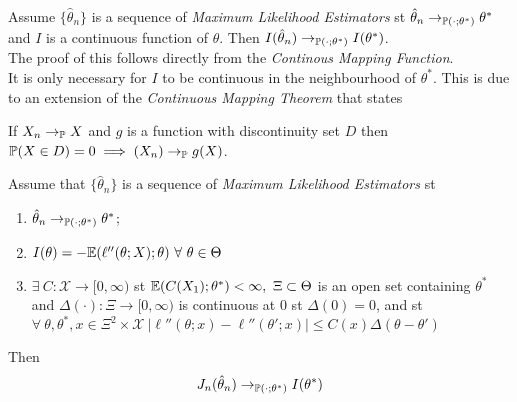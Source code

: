 \documentclass[11pt,a4paper]{article}
\begin{document}
Assume $\{\hat{\theta}_n\}$ is a sequence of \textit{Maximum Likelihood Estimators} st $\hat{\theta}_n\to_{\mathbb{P}(\cdot;\theta^*)}\theta^*$ and $I$ is a continuous function of $\theta$. Then $I(\hat{\theta}_n)\to_{\mathbb{P}(\cdot;\theta^*)}I(\theta^*)$.\\
\nb The proof of this follows directly from the \textit{Continous Mapping Function}.\\

It is only necessary for $I$ to be continuous in the neighbourhood of $\theta^*$. This is due to an extension of the \textit{Continuous Mapping Theorem} that states
\begin{center}
If $X_n\to_{\mathbb{P}} X$ and $g$ is a function with discontinuity set $D$ then $\mathbb{P}(X\in D)=0\implies (X_n)\to_{\mathbb{P}} g(X)$.
\end{center}

Assume that $\{\hat{\theta}_n\}$ is a sequence of \textit{Maximum Likelihood Estimators} st
\begin{enumerate}[label=\roman*)]
	\item $\hat{\theta}_n\to_{\mathbb{P}(\cdot;\theta^*)}\theta^*$;
	\item $I(\theta)=-\expect(\ell''(\theta;X);\theta)\ \forall\ \theta\in\Theta$
	\item $\exists\ C:\mathcal{X}\to[0,\infty)$ st $\expect(C(X_1);\theta^*)<\infty,\ \Xi\subset\Theta$ is an open set containing $\theta^*$ and $\Delta(\cdot):\Xi\to[0,\infty)$ is continuous at 0 st $\Delta(0)=0$, and st ${\forall\ \theta,\theta^*,x\in \Xi^2\times\mathcal{X}\ |\ell''(\theta;x)-\ell''(\theta';x)|\leq C(x)\Delta(\theta-\theta')}$
\end{enumerate}
Then
$$J_n(\hat{\theta}_n)\to_{\mathbb{P}(\cdot;\theta^*)}I(\theta^*)$$
\end{document}
